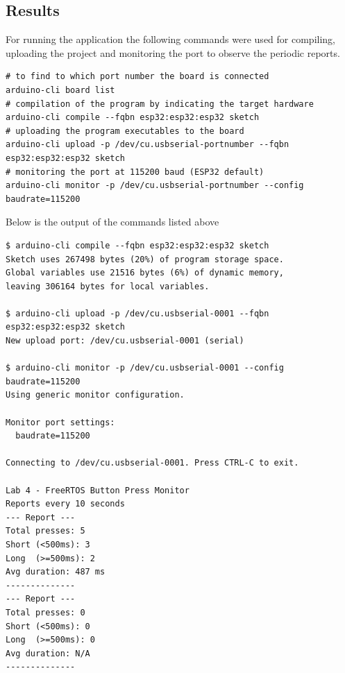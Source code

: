 \subsection{Results}

For running the application the following commands were used for compiling,
uploading the project and monitoring the port to observe the periodic reports.

\begin{verbatim}
# to find to which port number the board is connected
arduino-cli board list
# compilation of the program by indicating the target hardware
arduino-cli compile --fqbn esp32:esp32:esp32 sketch
# uploading the program executables to the board
arduino-cli upload -p /dev/cu.usbserial-portnumber --fqbn esp32:esp32:esp32 sketch
# monitoring the port at 115200 baud (ESP32 default)
arduino-cli monitor -p /dev/cu.usbserial-portnumber --config baudrate=115200
\end{verbatim}

Below is the output of the commands listed above

\begin{verbatim}
$ arduino-cli compile --fqbn esp32:esp32:esp32 sketch
Sketch uses 267498 bytes (20%) of program storage space.
Global variables use 21516 bytes (6%) of dynamic memory,
leaving 306164 bytes for local variables.

$ arduino-cli upload -p /dev/cu.usbserial-0001 --fqbn esp32:esp32:esp32 sketch
New upload port: /dev/cu.usbserial-0001 (serial)

$ arduino-cli monitor -p /dev/cu.usbserial-0001 --config baudrate=115200
Using generic monitor configuration.

Monitor port settings:
  baudrate=115200

Connecting to /dev/cu.usbserial-0001. Press CTRL-C to exit.

Lab 4 - FreeRTOS Button Press Monitor
Reports every 10 seconds
--- Report ---
Total presses: 5
Short (<500ms): 3
Long  (>=500ms): 2
Avg duration: 487 ms
--------------
--- Report ---
Total presses: 0
Short (<500ms): 0
Long  (>=500ms): 0
Avg duration: N/A
--------------
\end{verbatim}

